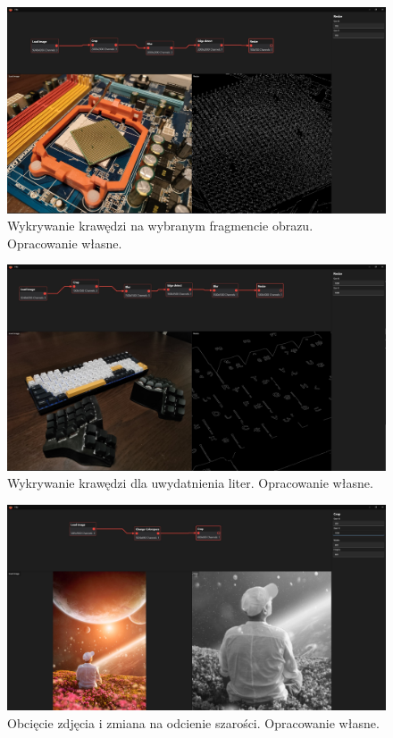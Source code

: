 \begin{figure}[H]
    \centering
    \includegraphics[width=1\linewidth]{images/Picture27.jpg}
    \caption{Wykrywanie krawędzi na wybranym fragmencie obrazu. Opracowanie własne.}
    \label{fig:socket}
\end{figure} 

\begin{figure}[H]
    \centering
    \includegraphics[width=1\linewidth]{images/Picture28.jpg}
    \caption{Wykrywanie krawędzi dla uwydatnienia liter. Opracowanie własne.}
    \label{fig:keyboard}
\end{figure} 

\begin{figure}[H]
    \centering
    \includegraphics[width=1\linewidth]{images/Picture29.jpg}
    \caption{Obcięcie zdjęcia i zmiana na odcienie szarości. Opracowanie własne.}
    \label{fig:person}
\end{figure} 

